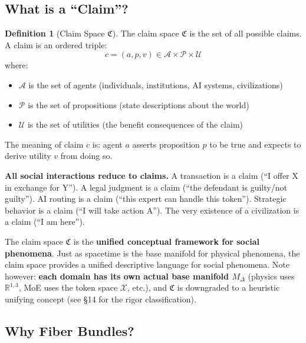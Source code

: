 \documentclass[12pt,a4paper]{article}
\theoremstyle{plain}
\theoremstyle{definition}
\newtheorem{definition}[theorem]{Definition}
\newcommand{\R}{\mathbb{R}}
\newcommand{\Acal}{\mathcal{A}}
\newcommand{\Pcal}{\mathcal{P}}
\newcommand{\Ucal}{\mathcal{U}}
\newcommand{\ClaimSpace}{\mathfrak{C}}
\begin{document}
\subsection{What is a ``Claim''?}

\begin{definition}[Claim Space $\ClaimSpace$]
The claim space $\ClaimSpace$ is the set of all possible claims. A claim is an ordered triple:
\begin{equation}
    c = (a, p, v) \in \Acal \times \Pcal \times \Ucal
\end{equation}
where:
\begin{itemize}
    \item $\Acal$ is the set of agents (individuals, institutions, AI systems, civilizations)
    \item $\Pcal$ is the set of propositions (state descriptions about the world)
    \item $\Ucal$ is the set of utilities (the benefit consequences of the claim)
\end{itemize}
The meaning of claim $c$ is: agent $a$ asserts proposition $p$ to be true and expects to derive utility $v$ from doing so.
\end{definition}

\textbf{All social interactions reduce to claims.} A transaction is a claim (``I offer X in exchange for Y'').
A legal judgment is a claim (``the defendant is guilty/not guilty'').
AI routing is a claim (``this expert can handle this token'').
Strategic behavior is a claim (``I will take action A'').
The very existence of a civilization is a claim (``I am here'').

The claim space $\ClaimSpace$ is the \textbf{unified conceptual framework for social phenomena}. Just as spacetime is the base manifold for physical phenomena, the claim space provides a unified descriptive language for social phenomena. Note however: \textbf{each domain has its own actual base manifold $M_\Delta$} (physics uses $\R^{1,3}$, MoE uses the token space $\mathcal{X}$, etc.), and $\ClaimSpace$ is downgraded to a heuristic unifying concept (see \S 14 for the rigor classification).

\subsection{Why Fiber Bundles?}
\end{document}
